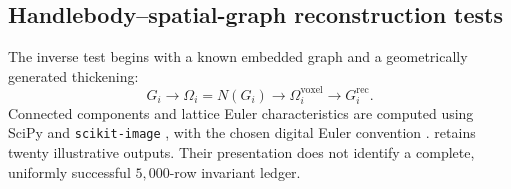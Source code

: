 \subsection{Handlebody--spatial-graph reconstruction tests}
\label{supp:handlebody_validation}
The inverse test begins with a known embedded graph and a geometrically generated thickening:
\begin{equation}
G_i\longrightarrow\Omega_i=N(G_i)\longrightarrow\Omega_i^{\mathrm{voxel}}\longrightarrow G_i^{\mathrm{rec}}.
\label{suppeq:ground_truth_recovery}
\end{equation}
Connected components and lattice Euler characteristics are computed using SciPy and \texttt{scikit-image} \cite{kg_virtanen2020scipy,kg_vanderwalt2014skimage}, with the chosen digital Euler convention \cite{kg_ohser2002euler}.  retains twenty illustrative outputs. Their presentation does not identify a complete, uniformly successful $5{,}000$-row invariant ledger.

